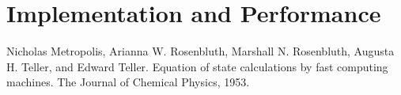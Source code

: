 \documentclass[12pt,a4paper,titlepage]{article}
\begin{document}
\newpage
\section{Implementation and Performance}



\begin{thebibliography}{9}



Nicholas Metropolis, Arianna W. Rosenbluth, Marshall N. Rosenbluth, Augusta H. Teller, and Edward
Teller. Equation of state calculations by fast computing machines. The Journal of Chemical Physics, 1953.



\end{thebibliography}
\end{document}
